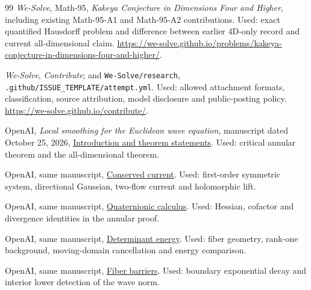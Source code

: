 \documentclass[11pt,a4paper]{article}
\numberwithin{equation}{section}
\theoremstyle{definition}
\theoremstyle{remark}
\begin{document}
\begin{thebibliography}{99}
 \emph{We-Solve}, Math-95, \emph{Kakeya
Conjecture in Dimensions Four and Higher}, including existing
Math-95-A1 and Math-95-A2 contributions. Used: exact quantified
Hausdorff problem and difference between earlier 4D-only record
and current all-dimensional claim.
\url{https://we-solve.github.io/problems/kakeya-conjecture-in-dimensions-four-and-higher/}.

 \emph{We-Solve}, \emph{Contribute}; and
\texttt{We-Solve/research}, \texttt{.github/ISSUE\_TEMPLATE/attempt.yml}.
Used: allowed attachment formats, classification, source attribution,
model disclosure and public-posting policy.
\url{https://we-solve.github.io/contribute/}.

 OpenAI, \emph{Local smoothing for the
Euclidean wave equation}, manuscript dated October 25, 2026,
\href{https://github.com/openai/math/blob/7ef5c0cc5ca4b0e072b7a050fca09ab24bc6fa3a/preprints/Local-smoothing-for-the-Euclidean-wave-equation-October-25-2026/build/sections/introduction.tex}{Introduction and theorem statements}.
Used: critical annular theorem and the all-dimensional theorem.

 OpenAI, same manuscript,
\href{https://github.com/openai/math/blob/7ef5c0cc5ca4b0e072b7a050fca09ab24bc6fa3a/preprints/Local-smoothing-for-the-Euclidean-wave-equation-October-25-2026/build/sections/current.tex}{Conserved current}. Used: first-order symmetric
system, directional Gaussian, two-flow current and holomorphic lift.

 OpenAI, same manuscript,
\href{https://github.com/openai/math/blob/7ef5c0cc5ca4b0e072b7a050fca09ab24bc6fa3a/preprints/Local-smoothing-for-the-Euclidean-wave-equation-October-25-2026/build/sections/calculus.tex}{Quaternionic calculus}. Used: Hessian,
cofactor and divergence identities in the annular proof.

 OpenAI, same manuscript,
\href{https://github.com/openai/math/blob/7ef5c0cc5ca4b0e072b7a050fca09ab24bc6fa3a/preprints/Local-smoothing-for-the-Euclidean-wave-equation-October-25-2026/build/sections/energy.tex}{Determinant energy}. Used: fiber geometry,
rank-one background, moving-domain cancellation and energy comparison.

 OpenAI, same manuscript,
\href{https://github.com/openai/math/blob/7ef5c0cc5ca4b0e072b7a050fca09ab24bc6fa3a/preprints/Local-smoothing-for-the-Euclidean-wave-equation-October-25-2026/build/sections/barrier.tex}{Fiber barriers}. Used: boundary exponential
decay and interior lower detection of the wave norm.


\end{thebibliography}
\end{document}
